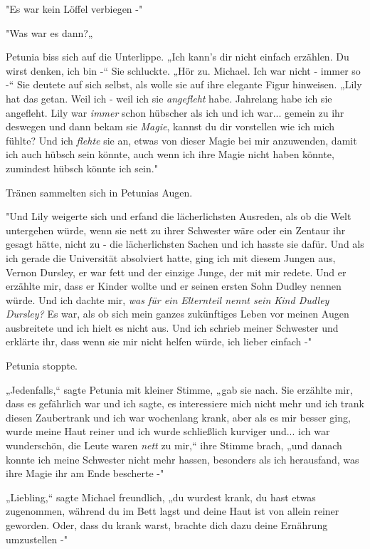 {"Es war kein Löffel verbiegen -"

"Was war es dann?„

Petunia biss sich auf die Unterlippe. „Ich kann's dir nicht einfach erzählen. Du wirst denken, ich bin -“ Sie schluckte. „Hör zu. Michael. Ich war nicht - immer so -“ Sie deutete auf sich selbst, als wolle sie auf ihre elegante Figur hinweisen. „Lily hat das getan. Weil ich - weil ich sie \emph{angefleht} habe. Jahrelang habe ich sie angefleht. Lily war \emph{immer} schon hübscher als ich und ich war... gemein zu ihr deswegen und dann bekam sie \emph{Magie}, kannst du dir vorstellen wie ich mich fühlte? Und ich \emph{flehte} sie an, etwas von dieser Magie bei mir anzuwenden, damit ich auch hübsch sein könnte, auch wenn ich ihre Magie nicht haben könnte, zumindest hübsch könnte ich sein."

Tränen sammelten sich in Petunias Augen.

"Und Lily weigerte sich und erfand die lächerlichsten Ausreden, als ob die Welt untergehen würde, wenn sie nett zu ihrer Schwester wäre oder ein Zentaur ihr gesagt hätte, nicht zu - die lächerlichsten Sachen und ich hasste sie dafür. Und als ich gerade die Universität absolviert hatte, ging ich mit diesem Jungen aus, Vernon Dursley, er war fett und der einzige Junge, der mit mir redete. Und er erzählte mir, dass er Kinder wollte und er seinen ersten Sohn Dudley nennen würde. Und ich dachte mir, \emph{was für ein Elternteil nennt sein Kind Dudley Dursley?} Es war, als ob sich mein ganzes zukünftiges Leben vor meinen Augen ausbreitete und ich hielt es nicht aus. Und ich schrieb meiner Schwester und erklärte ihr, dass wenn sie mir nicht helfen würde, ich lieber einfach -"

Petunia stoppte.

„Jedenfalls,“ sagte Petunia mit kleiner Stimme, „gab sie nach. Sie erzählte mir, dass es gefährlich war und ich sagte, es interessiere mich nicht mehr und ich trank diesen Zaubertrank und ich war wochenlang krank, aber als es mir besser ging, wurde meine Haut reiner und ich wurde schließlich kurviger und... ich war wunderschön, die Leute waren \emph{nett} zu mir,“ ihre Stimme brach, „und danach konnte ich meine Schwester nicht mehr hassen, besonders als ich herausfand, was ihre Magie ihr am Ende bescherte -"

„Liebling,“ sagte Michael freundlich, „du wurdest krank, du hast etwas zugenommen, während du im Bett lagst und deine Haut ist von allein reiner geworden. Oder, dass du krank warst, brachte dich dazu deine Ernährung umzustellen -"

}
